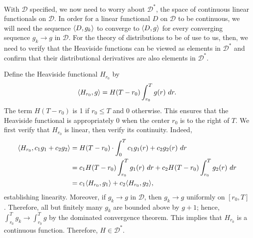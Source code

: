 \documentclass[12pt]{article}
\newcommand{\DD}{\mathcal{D}}
\DeclarePairedDelimiter{\ip}{\langle}{\rangle}
\begin{document}
With $\DD$ specified, we now need to worry about $\DD^*$, the space of
continuous linear functionals on $\DD$. In order for a linear functional $D$
on $\DD$ to be continuous, we will need the sequence $\ip{D, g_k}$ to
converge to $\ip{D, g}$ for every converging sequence $g_k \to g$ in $\DD$.
For the theory of distributions to be of use to us, then, we need to verify that
the Heaviside functions can be viewed as elements in $\DD^*$ and confirm that
their distributional derivatives are also elements in $\DD^*$.

Define the Heaviside functional $H_{r_0}$ by
\begin{equation*}
  \ip{H_{r_0}, g} = H(T-r_0) \int_{r_0}^{T} g(r) \ dr.
\end{equation*}
The term $H(T-r_0)$ is 1 if $r_0 \leq T$ and $0$ otherwise. This ensures that
the Heaviside functional is appropriately $0$ when the center $r_0$ is to the
right of $T$. We first verify that $H_{r_0}$ is linear, then verify its
continuity. Indeed, 
\begin{align*}
  \ip{H_{r_0}, c_1 g_1 + c_2 g_2} &= H(T - r_0) \cdot \int_0^T c_1 g_1(r)
  + c_2 g_2(r) \ dr \\
  &= c_1 H(T - r_0) \int_{r_0}^{T} g_1(r) \ dr + 
     c_2 H(T - r_0) \int_{r_0}^{T} g_2(r) \ dr \\
  &= c_1 \ip{H_{r_0}, g_1} + c_2 \ip{H_{r_0}, g_2},
\end{align*}
establishing linearity. Moreover, if $g_{k} \to g$ in $\DD$, then $g_k \to g$
uniformly on $[r_0, T]$. Therefore, all but finitely many $g_k$ are bounded
above by $g+1$; hence, $\int_{r_0}^T g_k \to \int_{r_0}^T g$ by the dominated
convergence theorem. This implies that $H_{r_0}$ is a continuous function.
Therefore, $H \in \DD^*$.
\end{document}
